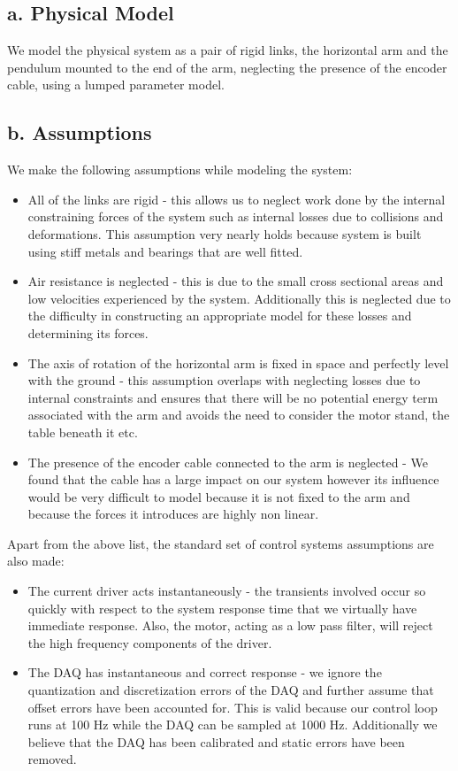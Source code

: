\documentclass{article}
\theoremstyle{plain}
\theoremstyle{definition}
\theoremstyle{remark}
\begin{document}
\subsection*{a. Physical Model}
We model the physical system as a pair of rigid links, the horizontal arm and the pendulum mounted to the end of the arm, neglecting the presence of the encoder cable, using a lumped parameter model.

\subsection*{b. Assumptions}
We make the following assumptions while modeling the system:
\begin{itemize}
\item All of the links are rigid - this allows us to neglect work done by the internal constraining forces of the system such as internal losses due to collisions and deformations. This assumption very nearly holds because system is built using stiff metals and bearings that are well fitted.

\item Air resistance is neglected - this is due to the small cross sectional areas and low velocities experienced by the system. Additionally this is neglected due to the difficulty in constructing an appropriate model for these losses and determining its forces.

\item The axis of rotation of the horizontal arm is fixed in space and perfectly level with the ground -  this assumption overlaps with neglecting losses due to internal constraints and ensures that there will be no potential energy term associated with the arm and avoids the need to consider the motor stand, the table beneath it etc.

\item The presence of the encoder cable connected to the arm is neglected - We found that the cable has a large impact on our system however its influence would be very difficult to model because it is not fixed to the arm and because the forces it introduces are highly non linear.   
\end{itemize}

Apart from the above list, the standard set of control systems assumptions are also made:
\begin{itemize}
\item The current driver acts instantaneously - the transients involved occur so quickly with respect to the system response time that we virtually have immediate response. Also, the motor, acting as a low pass filter, will reject the high frequency components of the driver.

\item The DAQ has instantaneous and correct response - we ignore the quantization and discretization errors of the DAQ and further assume that offset errors have been accounted for. This is valid because our control loop runs at 100 Hz while the DAQ can be sampled at 1000 Hz. Additionally we believe that the DAQ has been calibrated and static errors have been removed.
\end{itemize}
\end{document}
